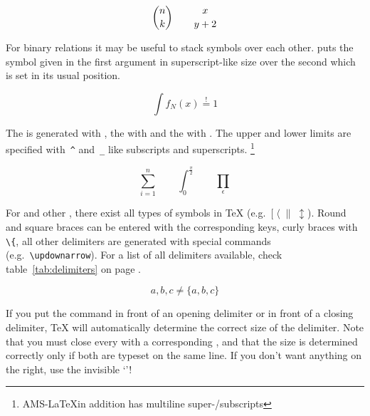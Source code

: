 \begin{example}
\begin{displaymath}
{n \choose k}\qquad {x \atop y+2}
\end{displaymath}
\end{example}

For binary relations it may be useful to stack symbols over each other.
 puts the symbol given
in the first argument in superscript-like size over the second which
is set in its usual position.

\begin{example}
\begin{displaymath}
\int f_N(x) \stackrel{!}{=} 1
\end{displaymath}
\end{example}
 
\medskip

The \textbf{} is generated with , the
\textbf{} with  and the \textbf{}
with . The upper and lower limits are specified with~\verb|^|
and~\verb|_| like subscripts and superscripts.
\footnote{AMS-\LaTeX in addition has multiline super-/subscripts}


\begin{example}
\begin{displaymath}
\sum_{i=1}^{n} \qquad
\int_{0}^{\frac{\pi}{2}} \qquad
\prod_\epsilon
\end{displaymath}
\end{example}

For \textbf{} and other , there exist all
types of symbols in \TeX{} (e.g.~$[\;\langle\;\|\;\updownarrow$).
Round and square braces can be entered with the corresponding keys,
curly braces with \verb|\{|, all other delimiters are generated with
special commands (e.g.~\verb|\updownarrow|). For a list of all
delimiters available, check table~\ref{tab:delimiters} on page
\pageref{tab:delimiters}.

\begin{example}
\begin{displaymath}
{a,b,c}\neq\{a,b,c\}
\end{displaymath}
\end{example}

If you put the command  in front of an opening delimiter or
 in front of a closing delimiter, \TeX{} will automatically
determine the correct size of the delimiter. Note that you must close
every  with a corresponding , and that the size is
determined correctly only if both are typeset on the same line. If you
don't want anything on the right, use the invisible `'!

